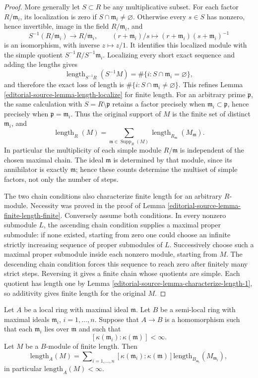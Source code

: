 \begin{proof}
More generally let $S\subset R$ be any multiplicative subset.
For each factor $R/\mathfrak m_i$, its localization is zero
if $S\cap\mathfrak m_i\neq\varnothing$. Otherwise every
$s\in S$ has nonzero, hence invertible, image in the field
$R/\mathfrak m_i$, and
$$
S^{-1}(R/\mathfrak m_i)\longrightarrow R/\mathfrak m_i,
\qquad (r+\mathfrak m_i)/s\longmapsto
(r+\mathfrak m_i)(s+\mathfrak m_i)^{-1}
$$
is an isomorphism, with inverse $z\mapsto z/1$.
It identifies this localized module with the simple quotient
$S^{-1}R/S^{-1}\mathfrak m_i$.
Localizing every short exact sequence and adding the lengths gives
$$
\operatorname{length}_{S^{-1}R}(S^{-1}M)
=\#\{i: S\cap\mathfrak m_i=\varnothing\},
$$
and therefore the exact loss of length is
$\#\{i:S\cap\mathfrak m_i\neq\varnothing\}$.
This refines Lemma \ref{editorial-source-lemma-length-localize} for finite length.
For an arbitrary prime $\mathfrak p$, the same calculation with
$S=R\setminus\mathfrak p$ retains a factor precisely when
$\mathfrak m_i\subset\mathfrak p$, hence precisely when
$\mathfrak p=\mathfrak m_i$.
Thus the original support of $M$ is the finite set of distinct
$\mathfrak m_i$, and
$$
\operatorname{length}_R(M)
=\sum_{\mathfrak m\in\operatorname{Supp}_R(M)}
  \operatorname{length}_{R_{\mathfrak m}}(M_{\mathfrak m}).
$$
In particular the multiplicity of each simple module
$R/\mathfrak m$ is independent of the chosen maximal chain.
The ideal $\mathfrak m$ is determined by that module, since
its annihilator is exactly $\mathfrak m$; hence these counts
determine the multiset of simple factors, not only the number
of steps.

The two chain conditions also characterize finite length for
an arbitrary $R$-module. Necessity was proved in the proof of
Lemma \ref{editorial-source-lemma-finite-length-finite}.
Conversely assume both conditions. In every nonzero submodule
$L$, the ascending chain condition supplies a maximal proper
submodule: if none existed, starting from zero one could choose
an infinite strictly increasing sequence of proper submodules
of $L$. Successively choose such a maximal proper submodule
inside each nonzero module, starting from $M$.
The descending chain condition forces this sequence to reach
zero after finitely many strict steps. Reversing it gives a
finite chain whose quotients are simple. Each quotient has
length one by Lemma \ref{editorial-source-lemma-characterize-length-1}, so
additivity gives finite length for the original $M$.
\end{proof}

\begin{lemma}
\label{editorial-source-lemma-pushdown-module}
Let $A$ be a local ring with maximal ideal $\mathfrak m$.
Let $B$ be a semi-local ring with maximal ideals $\mathfrak m_i$,
$i = 1, \ldots, n$.
Suppose that $A \to B$ is a homomorphism such that each $\mathfrak m_i$
lies over $\mathfrak m$ and such that
$$
[\kappa(\mathfrak m_i) : \kappa(\mathfrak m)] < \infty.
$$
Let $M$ be a $B$-module of finite length.
Then
$$
\text{length}_A(M) = \sum\nolimits_{i = 1, \ldots, n}
[\kappa(\mathfrak m_i) : \kappa(\mathfrak m)]
\text{length}_{B_{\mathfrak m_i}}(M_{\mathfrak m_i}),
$$
in particular $\text{length}_A(M) < \infty$.
\end{lemma}

